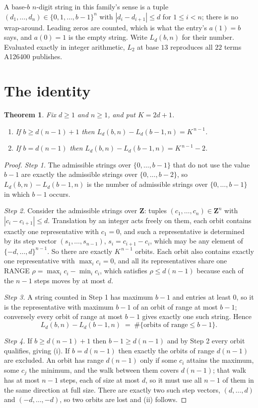 \documentclass[11pt,a4paper]{article}
\theoremstyle{plain}
\newtheorem{theorem}{Theorem}
\theoremstyle{definition}
\begin{document}
A base-$b$ $n$-digit string in this family's sense is a tuple
$(d_1,\dots,d_n)\in\{0,1,\dots,b-1\}^{n}$ with $|d_i-d_{i+1}|\le d$ for $1\le i<n$; there
is no wrap-around. Leading zeros are counted, which is what the entry's $a(1)=b$ says, and
$a(0)=1$ is the empty string. Write $L_d(b,n)$ for their number. Evaluated exactly in integer
arithmetic, $L_{2}$ at base $13$ reproduces all $22$ terms A126400 publishes.

\section{The identity}

\begin{theorem}
Fix $d\ge1$ and $n\ge1$, and put $K=2d+1$.
\begin{enumerate}
\item[(i)] If $b\ge d(n-1)+1$ then $L_d(b,n)-L_d(b-1,n)=K^{\,n-1}$.
\item[(ii)] If $b=d(n-1)$ then $L_d(b,n)-L_d(b-1,n)=K^{\,n-1}-2$.
\end{enumerate}
\end{theorem}

\begin{proof}
\emph{Step 1.} The admissible strings over $\{0,\dots,b-1\}$ that do not use the value $b-1$
are exactly the admissible strings over $\{0,\dots,b-2\}$, so $L_d(b,n)-L_d(b-1,n)$ is the
number of admissible strings over $\{0,\dots,b-1\}$ in which $b-1$ occurs.

\emph{Step 2.} Consider the admissible strings over $\mathbf{Z}$: tuples
$(c_1,\dots,c_n)\in\mathbf{Z}^{n}$ with $|c_i-c_{i+1}|\le d$. Translation by an integer acts
freely on them, each orbit contains exactly one representative with $c_1=0$, and such a
representative is determined by its step vector $(s_1,\dots,s_{n-1})$, $s_i=c_{i+1}-c_i$,
which may be any element of $\{-d,\dots,d\}^{n-1}$. So there are exactly $K^{\,n-1}$ orbits.
Each orbit also contains exactly one representative with $\max_i c_i=0$, and all its
representatives share one RANGE $\rho=\max_ic_i-\min_ic_i$, which satisfies
$\rho\le d(n-1)$ because each of the $n-1$ steps moves by at most $d$.

\emph{Step 3.} A string counted in Step 1 has maximum $b-1$ and entries at least $0$, so it is
the representative with maximum $b-1$ of an orbit of range at most $b-1$; conversely every orbit
of range at most $b-1$ gives exactly one such string. Hence
\[
L_d(b,n)-L_d(b-1,n)\;=\;\#\{\text{orbits of range}\le b-1\} .
\]

\emph{Step 4.} If $b\ge d(n-1)+1$ then $b-1\ge d(n-1)$ and by Step 2 every orbit qualifies,
giving (i). If $b=d(n-1)$ then exactly the orbits of range $d(n-1)$ are excluded. An orbit has
range $d(n-1)$ only if some $c_i$ attains the maximum, some $c_j$ the minimum, and the walk
between them covers $d(n-1)$; that walk has at most $n-1$ steps, each of size at most $d$, so it
must use all $n-1$ of them in the same direction at full size. There are exactly two such step
vectors, $(d,\dots,d)$ and $(-d,\dots,-d)$, so two orbits are lost and (ii) follows.
\end{proof}
\end{document}
